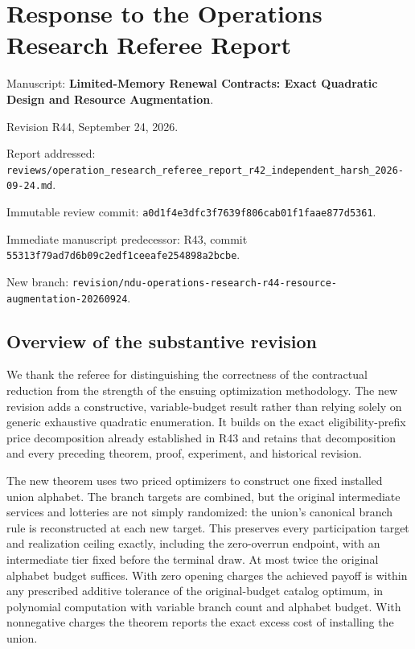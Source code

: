 \documentclass[11pt,letterpaper]{article}
\begin{document}
\section*{Response to the Operations Research Referee Report}


Manuscript: \textbf{Limited-Memory Renewal Contracts: Exact Quadratic Design and Resource Augmentation}.



Revision R44, September 24, 2026.



Report addressed: \nolinkurl{reviews/operation_research_referee_report_r42_independent_harsh_2026-09-24.md}.



Immutable review commit: \nolinkurl{a0d1f4e3dfc3f7639f806cab01f1faae877d5361}.



Immediate manuscript predecessor: R43, commit \nolinkurl{55313f79ad7d6b09c2edf1ceeafe254898a2bcbe}.



New branch: \nolinkurl{revision/ndu-operations-research-r44-resource-augmentation-20260924}.



\subsection*{Overview of the substantive revision}


We thank the referee for distinguishing the correctness of the contractual reduction from the strength of the ensuing optimization methodology. The new revision adds a constructive, variable-budget result rather than relying solely on generic exhaustive quadratic enumeration. It builds on the exact eligibility-prefix price decomposition already established in R43 and retains that decomposition and every preceding theorem, proof, experiment, and historical revision.



The new theorem uses two priced optimizers to construct one fixed installed union alphabet. The branch targets are combined, but the original intermediate services and lotteries are not simply randomized: the union's canonical branch rule is reconstructed at each new target. This preserves every participation target and realization ceiling exactly, including the zero-overrun endpoint, with an intermediate tier fixed before the terminal draw. At most twice the original alphabet budget suffices. With zero opening charges the achieved payoff is within any prescribed additive tolerance of the original-budget catalog optimum, in polynomial computation with variable branch count and alphabet budget. With nonnegative charges the theorem reports the exact excess cost of installing the union.
\end{document}
